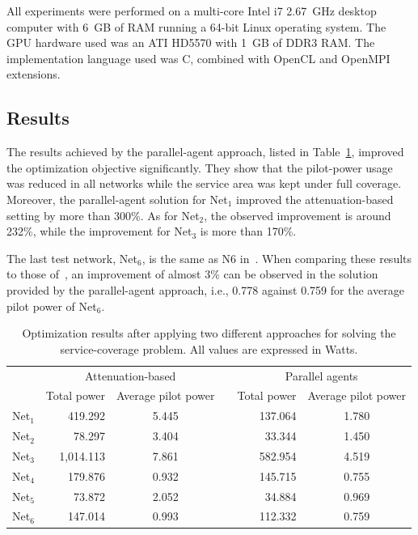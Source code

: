 \bigskip{}


All experiments were performed on a multi-core Intel i7 2.67~GHz
desktop computer with 6~GB of RAM running a 64-bit Linux operating
system. The GPU hardware used was an ATI HD5570 with 1~GB of DDR3
RAM. The implementation language used was C, combined with OpenCL
and OpenMPI extensions.


\subsection{Results}

The results achieved by the parallel-agent approach, listed in Table~\ref{tab:06-Optimization_results},
improved the optimization objective significantly. They show that
the pilot-power usage was reduced in all networks while the service
area was kept under full coverage. Moreover, the parallel-agent solution
for Net$_{1}$ improved the attenuation-based setting by more than
300\%. As for Net$_{2}$, the observed improvement is around 232\%,
while the improvement for Net$_{3}$ is more than 170\%. 

The last test network, Net$_{6}$, is the same as N6 in~\cite{Siomina:Minimum.pilot.power.for.service.coverage}.
When comparing these results to those of~\cite{Siomina:Minimum.pilot.power.for.service.coverage},
an improvement of almost 3\% can be observed in the solution provided
by the parallel-agent approach, i.e., 0.778 against 0.759 for the
average pilot power of Net$_{6}$.

\begin{table}
\caption{Optimization results after applying two different approaches for solving
the service-coverage problem. All values are expressed in Watts.\emph{\label{tab:06-Optimization_results}}}


\centering

\begin{tabular}{crccrc}
\cmidrule{2-6} 
 & \multicolumn{2}{c}{Attenuation-based} &  & \multicolumn{2}{c}{Parallel agents}\tabularnewline\addlinespace
\cmidrule{2-3} \cmidrule{5-6} 
 & Total power & Average pilot power &  & Total power & Average pilot power\tabularnewline\addlinespace
\cmidrule{1-3} \cmidrule{5-6} 
Net$_{1}$ & 419.292 & 5.445 &  & 137.064 & 1.780\tabularnewline
Net$_{2}$ & 78.297 & 3.404 &  & 33.344 & 1.450\tabularnewline
Net$_{3}$ & 1,014.113 & 7.861 &  & 582.954 & 4.519\tabularnewline
Net$_{4}$ & 179.876 & 0.932 &  & 145.715 & 0.755\tabularnewline
Net$_{5}$ & 73.872 & 2.052 &  & 34.884 & 0.969\tabularnewline
Net$_{6}$ & 147.014 & 0.993 &  & 112.332 & 0.759\tabularnewline
\bottomrule
\end{tabular}
\end{table}



